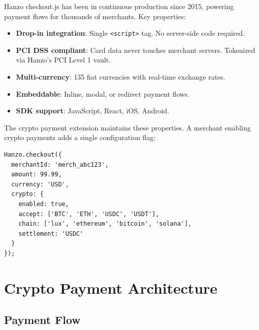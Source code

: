 \documentclass[11pt]{article}
\begin{document}
Hanzo checkout.js has been in continuous production since 2015, powering
payment flows for thousands of merchants. Key properties:

\begin{itemize}[leftmargin=1.4em]
    \item \textbf{Drop-in integration}: Single \texttt{<script>} tag.
    No server-side code required.
    \item \textbf{PCI DSS compliant}: Card data never touches merchant
    servers. Tokenized via Hanzo's PCI Level 1 vault.
    \item \textbf{Multi-currency}: 135 fiat currencies with real-time
    exchange rates.
    \item \textbf{Embeddable}: Inline, modal, or redirect payment flows.
    \item \textbf{SDK support}: JavaScript, React, iOS, Android.
\end{itemize}

The crypto payment extension maintains these properties. A merchant
enabling crypto payments adds a single configuration flag:

\begin{verbatim}
Hanzo.checkout({
  merchantId: 'merch_abc123',
  amount: 99.99,
  currency: 'USD',
  crypto: {
    enabled: true,
    accept: ['BTC', 'ETH', 'USDC', 'USDT'],
    chain: ['lux', 'ethereum', 'bitcoin', 'solana'],
    settlement: 'USDC'
  }
});
\end{verbatim}

\section{Crypto Payment Architecture}
\label{sec:architecture}

\subsection{Payment Flow}
\end{document}
